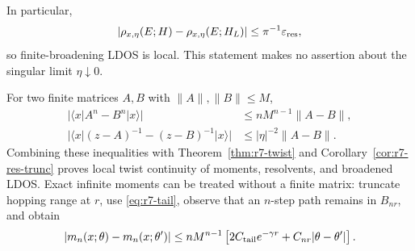 In particular,
\begin{equation}
 |\rho_{x,\eta}(E;H)-\rho_{x,\eta}(E;H_L)|
 \le \pi^{-1}\varepsilon_{\rm res},
\end{equation}
so finite-broadening LDOS is local.  This statement makes no assertion about
the singular limit $\eta\downarrow0$.

For two finite matrices $A,B$ with $\|A\|,\|B\|\le M$,
\begin{align}
 |\langle x|A^n-B^n|x\rangle|&\le nM^{n-1}\|A-B\|,\\
 |\langle x|(z-A)^{-1}-(z-B)^{-1}|x\rangle|
 &\le |\eta|^{-2}\|A-B\|.
 \label{eq:r7-local-observable-lipschitz}
\end{align}
Combining these inequalities with Theorem~\ref{thm:r7-twist} and
Corollary~\ref{cor:r7-res-trunc} proves local twist continuity of moments,
resolvents, and broadened LDOS.  Exact infinite moments can be treated without
a finite matrix: truncate hopping range at $r$, use
\eqref{eq:r7-tail}, observe that an $n$-step path remains in $B_{nr}$, and
obtain
\begin{equation}
 |m_n(x;\theta)-m_n(x;\theta')|
 \le nM^{n-1}\left[2C_{\rm tail}e^{-\gamma r}
 +C_{nr}|\theta-\theta'|\right].
 \label{eq:r7-moment-bound}
\end{equation}
